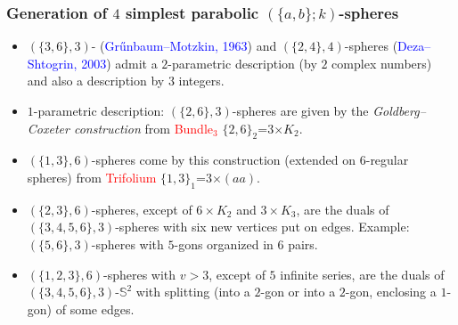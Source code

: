 \documentclass{beamer}
\begin{document}
\begin{frame}\frametitle{Generation of $4$ simplest parabolic $(\{a,b\};k)$-spheres}
\vspace{-2mm}
\begin{itemize}
\item
$(\{3,6\},3)$- (\textcolor{blue}{Gr\H{u}nbaum--Motzkin, 1963}) and
$(\{2,4\},4)$-spheres (\textcolor{blue}{Deza--Shtogrin, 2003})
admit a 
 $2$-parametric
 description (by $2$ complex numbers) and also a description by $3$ integers.
\bigskip


\item $1$-parametric description: $(\{2,6\},3)$-spheres are given by the {\em Goldberg--Coxeter
construction}
from  \textcolor{red}{Bundle$_3$} $\{2,6\}_{2}$=$3$$\times$$ K_2$.
\item
$(\{1,3\},6)$-spheres come by this
construction (extended  on $6$-regular spheres)
from
 \textcolor{red}{Trifolium} $\{1,3\}_{1}$=$3$$\times $$(aa)$.


\bigskip



\item $(\{2,3\},6)$-spheres, except of $6\times K_2$ and $3\times K_3$, are
the duals of  $(\{3,4,5,6\},3)$-spheres with six new
vertices put on  edges.
Example: $(\{5, 6\},3)$-spheres
with $5$-gons organized in 
$6$ pairs.

\item 
$(\{1,2,3\},6)$-spheres with $v$$>$$3$, except of $5$ infinite series, are
 the duals of  $(\{3,4,5,6\},3)$-$\mathbb{S}^2$ 
 with  splitting (into a $2$-gon or into a $2$-gon, enclosing a $1$-gon) of some edges. 



 \end{itemize}



\end{frame}

\end{document}
